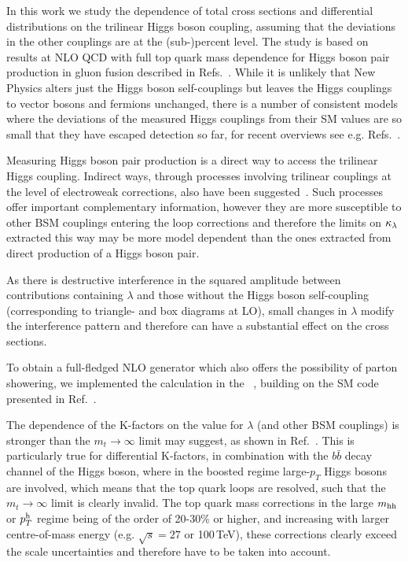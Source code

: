 


In this work we study the dependence of total cross sections and differential distributions on the trilinear Higgs boson coupling, assuming that the deviations in the other couplings are at the (sub-)percent level.
The study is based on results at NLO QCD with full top quark mass dependence for Higgs boson pair production in gluon fusion described in Refs.~\cite{Borowka:2016ehy,Borowka:2016ypz}. 
While it is unlikely that New Physics alters just the Higgs boson self-couplings but leaves the Higgs couplings to vector bosons and fermions unchanged, there is a number of consistent models where the deviations of the measured Higgs couplings from their SM values are so small that they have escaped detection so far, for recent overviews see e.g. Refs.~\cite{Cepeda:2019klc,Brooijmans:2018xbu,deFlorian:2016spz}.

Measuring Higgs boson pair production is a direct way to access the trilinear Higgs coupling. Indirect ways, through processes involving trilinear couplings at the level of electroweak corrections, also have been suggested~\cite{Gorbahn:2019lwq,Nakamura:2018bli,Borowka:2018pxx,Kilian:2018bhs,Vryonidou:2018eyv,Maltoni:2018ttu,Maltoni:2017ims,Kribs:2017znd,Degrassi:2017ucl,Bizon:2016wgr,Degrassi:2016wml,Gorbahn:2016uoy,McCullough:2013rea}.
Such processes offer important complementary information, however they are more susceptible to other BSM couplings entering the loop corrections 
and therefore the limits on $\kappa_{\lambda}$ extracted this way may be more model dependent than the ones extracted from direct production of a Higgs boson pair.

As there is destructive interference in the squared amplitude between contributions containing $\lambda$ and those without the Higgs boson self-coupling (corresponding to triangle- and box diagrams at LO), 
small changes in $\lambda$ modify the interference pattern and therefore can have a substantial effect on the cross sections.

To obtain a full-fledged NLO generator which also offers the possibility of parton showering, we implemented the calculation in the 
\powhegbox~\cite{Nason:2004rx,Frixione:2007vw,Alioli:2010xd}, building on the SM code presented in Ref.~\cite{Heinrich:2017kxx}.

The dependence of the K-factors on the value for $\lambda$ (and other BSM couplings) is stronger than the $m_t\to\infty$ limit may suggest, as shown in Ref.~\cite{Buchalla:2018yce}. This is particularly true for differential K-factors, 
in combination with the $b\bar{b}$ decay channel of the Higgs boson, where in the boosted regime large-$p_T$ Higgs bosons are involved, which means that the top quark loops are resolved, such that the  $m_t\to\infty$ limit is clearly invalid.
The top quark mass corrections in the large $m_{\mathrm{hh}}$ or $p_T^{\mathrm{h}}$ regime being of the order of 20-30\% or higher, and increasing with larger centre-of-mass energy (e.g. $\sqrt{s}=27$ or 100\,TeV), these corrections clearly exceed the scale uncertainties and therefore have to be taken into account.

